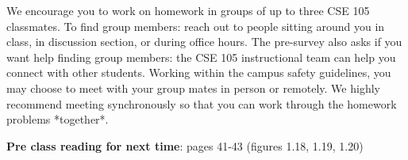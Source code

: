 We encourage you to work on homework in groups of up to three CSE 105 classmates. 
To find group members: reach out to people sitting around you in class, in discussion section, 
or during office hours. The pre-survey also asks if you want help finding group members: 
the CSE 105 instructional team can help you connect with other students. Working within the 
campus safety guidelines, you may choose to meet with your group mates in person or remotely. 
We highly recommend meeting synchronously so that you can work through the homework problems *together*. 

{\bf Pre class reading for next time}: pages 41-43 (figures 1.18, 1.19, 1.20)

\newpage
